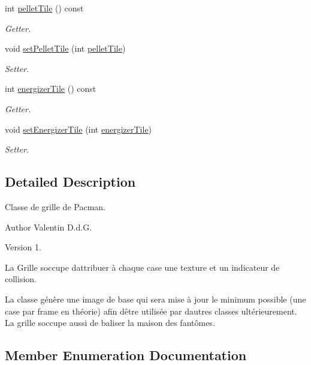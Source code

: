 \begin{DoxyCompactItemize}
int \hyperlink{class_grid_a9816017ce1a36bdad4d489383d19acc6}{pellet\+Tile} () const 
\begin{DoxyCompactList}\small\item\em Getter. \end{DoxyCompactList}\item 
void \hyperlink{class_grid_ac97425f75ec6edde70f12a8d2f3b450f}{set\+Pellet\+Tile} (int \hyperlink{class_grid_a9816017ce1a36bdad4d489383d19acc6}{pellet\+Tile})
\begin{DoxyCompactList}\small\item\em Setter. \end{DoxyCompactList}\item 
int \hyperlink{class_grid_afa7b0cbe21203a8bf089ab537510392c}{energizer\+Tile} () const 
\begin{DoxyCompactList}\small\item\em Getter. \end{DoxyCompactList}\item 
void \hyperlink{class_grid_a72e0bb85cb48c443e409b4fdffe8c40c}{set\+Energizer\+Tile} (int \hyperlink{class_grid_afa7b0cbe21203a8bf089ab537510392c}{energizer\+Tile})
\begin{DoxyCompactList}\small\item\em Setter. \end{DoxyCompactList}\end{DoxyCompactItemize}


\subsection{Detailed Description}
Classe de grille de Pacman. 

\begin{DoxyAuthor}{Author}
Valentin D.\+d.\+G. 
\end{DoxyAuthor}
\begin{DoxyVersion}{Version}
1.
\end{DoxyVersion}
La Grille s\textquotesingle{}occupe d\textquotesingle{}attribuer à chaque case une texture et un indicateur de collision.

La classe génère une image de base qui sera mise à jour le minimum possible (une case par frame en théorie) afin d\textquotesingle{}être utilisée par d\textquotesingle{}autres classes ultérieurement. La grille s\textquotesingle{}occupe aussi de baliser la maison des fantômes. 

\subsection{Member Enumeration Documentation}
\hypertarget{class_grid_a473f8c5d768a1734d8911bf1213ce10f}{}
